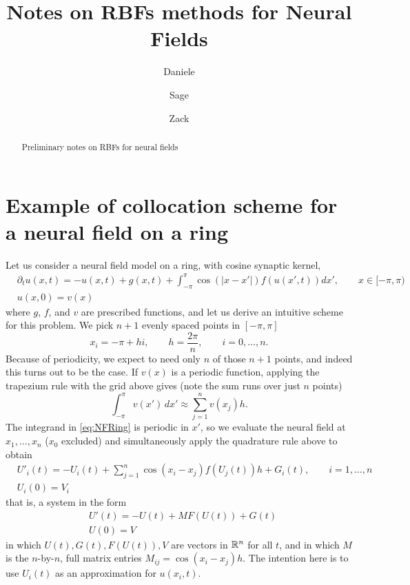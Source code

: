 \documentclass[a4paper]{siamart190516}
\title{Notes on RBFs methods for Neural Fields}
\author{%
  Daniele 
  \and
  Sage 
  \and 
  Zack 
}
\begin{document}
\maketitle

\begin{abstract}
  Preliminary notes on RBFs for neural fields
\end{abstract}
  
\section{Example of collocation scheme for a neural field on a ring} 
Let us consider a neural field model on a ring, with cosine synaptic kernel, 
\begin{equation}\label{eq:NFRing}
  \begin{aligned}
 & \partial_t u(x,t) =  -u(x,t) + g(x,t)+ \int_{-\pi}^{\pi} \cos(|x-x'|) f(u(x',t)) dx',
   \qquad x \in [-\pi,\pi) \\
 & u(x,0) = v(x) 
  \end{aligned}
\end{equation}
where $g$, $f$, and $v$ are prescribed functions, and let us derive an intuitive scheme
for this problem. We pick $n+1$ evenly spaced points in $[-\pi,\pi]$
\begin{equation}\label{eq:nodesRing}
  x_i = -\pi + h i, \qquad h = \frac{2\pi}{n}, \qquad i = 0, \ldots, n.
\end{equation}
Because of periodicity, we expect to need only $n$ of those $n+1$ points, and indeed
this turns out to be the case. If $v(x)$ is a periodic function, applying the
trapezium rule with the grid above gives (note the sum runs over just $n$ points)
\[
  \int_{-\pi}^{\pi} v(x')\,d x' \approx \sum_{j=1}^{n} v(x_j) h.
\]
The integrand in \cref{eq:NFRing} is periodic in $x'$, so we evaluate the neural
field at $x_1, \ldots, x_n$ ($x_0$ excluded) and simultaneously apply the quadrature rule
above to obtain
\[
  \begin{aligned}
  & U'_i(t) = -U_i(t) + \sum_{j=1}^{n} \cos(x_i - x_j) f(U_j(t)) h + G_i(t), \qquad i = 1,\ldots,n  \\
  & U_i(0) = V_i
  \end{aligned}
\]
that is, a system in the form 
\begin{equation}\label{eq:NFODE}
  \begin{aligned}
   &  U'(t) = - U(t) + M F(U(t)) +  G(t)\\ 
   &  U(0) = V
  \end{aligned}
\end{equation}  
in which $U(t), G(t), F(U(t)), V$ are vectors in $\mathbb{R}^n$ for all $t$, and in which
$M$ is the $n$-by-$n$, full matrix entries $M_{ij} = \cos(x_i - x_j)h$. The intention
here is to use $U_i(t)$ as an approximation for $u(x_i,t)$.
\end{document}
